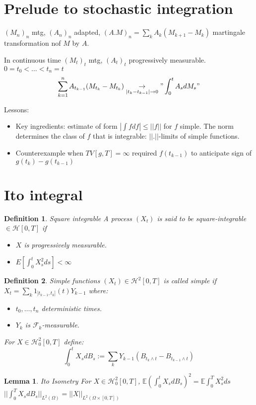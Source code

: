 \documentclass{article}
\newtheorem{definition}{Definition}
\newtheorem{lemma}[theorem]{Lemma}
\newcommand{\esp}{{\mathbb E}}
\begin{document}
\section{Prelude to stochastic integration}

$(M_n)_n$ mtg, $(A_n)_n$ adapted, $(A.M)_n = \sum_k A_k (M_{k+1} - M_k)$ martingale transformation nof $M$ by $A$.

In continuous time $(M_t)_t$ mtg, $(A_t)_t$ progressively measurable. $0 = t_0 < \ldots < t_n = t$
$$\sum_{k=1}^n A_{t_{k-1}} (M_{t_k} - M_{t_k}) \underset{|t_k - t_{k-1}|\rightarrow 0}{\rightarrow} "\int_0^t A_s dM_s"$$

Lessons:
\begin{itemize}
\item Key ingredients: estimate of form $|\int f df| \le ||f||$ for $f$ simple. The norm determines the class of $f$ that is integrable: $||.||$-limits of simple functions.
\item Counterexample when $TV[g, T] = \infty$ required $f(t_{k-1})$ to anticipate sign of $g(t_k) - g(t_{k-1})$
\end{itemize}

\section{Ito integral}
\begin{definition}{Square integrable}
  A process $(X_t)$ is said to be square-integrable $\in \mathcal H[0, T]$ if
  \begin{itemize}
  \item $X$ is progressively measurable.
  \item $E[\int_0^t X_s^2 ds] < \infty$
  \end{itemize}
\end{definition}
\begin{definition}{Simple functions}
  $(X_t) \in \mathcal H^2[0, T]$ is called simple if $X_t = \sum_k 1_{]t_{k-1}, t_k]}(t) Y_{k-1}$ where:
  \begin{itemize}
  \item $t_0, \ldots, t_n$ deterministic times.
  \item  $Y_k$ is $\mathcal F_k$-measurable.
  \end{itemize}
  For $X \in \mathcal H_0^2[0, T]$ define:
  $$\int_0^t X_s dB_s := \sum_k Y_{k-1} (B_{t_k \wedge t} - B_{t_{k-1} \wedge t})$$
\end{definition}
\begin{lemma}{Ito Isometry}
  For $X \in \mathcal H_0^2[0, T]$,
  $\esp (\int_0^t X_s dB_s)^2 = \esp \int_0^T X_s^2 ds$
  $||\int_0^TX_sdB_s||_{L^2(\Omega)} = ||X||_{L^2(\Omega \times [0, T])}$
\end{lemma}
\end{document}

